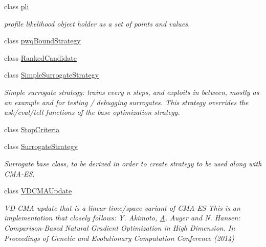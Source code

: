 \begin{DoxyCompactItemize}
class \hyperlink{classlibcmaes_1_1pli}{pli}
\begin{DoxyCompactList}\small\item\em profile likelihood object holder as a set of points and values. \end{DoxyCompactList}\item 
class \hyperlink{classlibcmaes_1_1pwqBoundStrategy}{pwq\+Bound\+Strategy}
\item 
class \hyperlink{classlibcmaes_1_1RankedCandidate}{Ranked\+Candidate}
\item 
class \hyperlink{classlibcmaes_1_1SimpleSurrogateStrategy}{Simple\+Surrogate\+Strategy}
\begin{DoxyCompactList}\small\item\em Simple surrogate strategy\+: trains every n steps, and exploits in between, mostly as an example and for testing / debugging surrogates. This strategy overrides the ask/eval/tell functions of the base optimization strategy. \end{DoxyCompactList}\item 
class \hyperlink{classlibcmaes_1_1StopCriteria}{Stop\+Criteria}
\item 
class \hyperlink{classlibcmaes_1_1SurrogateStrategy}{Surrogate\+Strategy}
\begin{DoxyCompactList}\small\item\em Surrogate base class, to be derived in order to create strategy to be used along with C\+M\+A-\/\+E\+S. \end{DoxyCompactList}\item 
class \hyperlink{classlibcmaes_1_1VDCMAUpdate}{V\+D\+C\+M\+A\+Update}
\begin{DoxyCompactList}\small\item\em V\+D-\/\+C\+M\+A update that is a linear time/space variant of C\+M\+A-\/\+E\+S This is an implementation that closely follows\+: Y. Akimoto, \hyperlink{classA}{A}. Auger and N. Hansen\+: Comparison-\/\+Based Natural Gradient Optimization in High Dimension. In Proceedings of Genetic and Evolutionary Computation Conference (2014) \end{DoxyCompactList}\end{DoxyCompactItemize}
